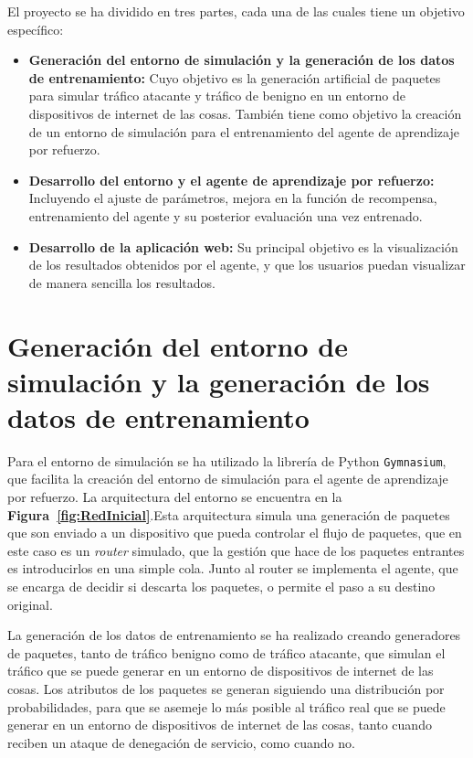 
El proyecto se ha dividido en tres partes, cada una de las cuales tiene un objetivo específico:
\begin{itemize}
    \item \textbf{Generación del entorno de simulación y la generación de los datos de entrenamiento:} Cuyo objetivo es la generación artificial de paquetes para simular tráfico atacante y tráfico de benigno en un entorno de dispositivos de internet de las cosas. También tiene como objetivo la creación de un entorno de simulación para el entrenamiento del agente de aprendizaje por refuerzo.
    \item \textbf{Desarrollo del entorno y el agente de aprendizaje por refuerzo:} Incluyendo el ajuste de parámetros, mejora en la función de recompensa, entrenamiento del agente y su posterior evaluación una vez entrenado.
    \item \textbf{Desarrollo de la aplicación web:} Su principal objetivo es la visualización de los resultados obtenidos por el agente, y que los usuarios puedan visualizar de manera sencilla los resultados.
\end{itemize}

\section{Generación del entorno de simulación y la generación de los datos de entrenamiento}
Para el entorno de simulación se ha utilizado la librería de Python \texttt{Gymnasium}, que facilita la creación del entorno de simulación para el agente de aprendizaje por refuerzo.
La arquitectura del entorno se encuentra en la \textbf{Figura~\ref{fig:RedInicial}}.Esta arquitectura simula una generación de paquetes que son enviado a un dispositivo que pueda controlar el flujo de paquetes, que en este caso es un \textit{router} simulado, que la gestión que hace de los paquetes entrantes es introducirlos en una simple cola. Junto al router se implementa el agente, que se encarga de decidir si descarta los paquetes, o permite el paso a su destino original.

La generación de los datos de entrenamiento se ha realizado creando generadores de paquetes, tanto de tráfico benigno como de tráfico atacante, que simulan el tráfico que se puede generar en un entorno de dispositivos de internet de las cosas. Los atributos de los paquetes se generan siguiendo una distribución por probabilidades, para que se asemeje lo más posible al tráfico real que se puede generar en un entorno de dispositivos de internet de las cosas, tanto cuando reciben un ataque de denegación de servicio, como cuando no.


